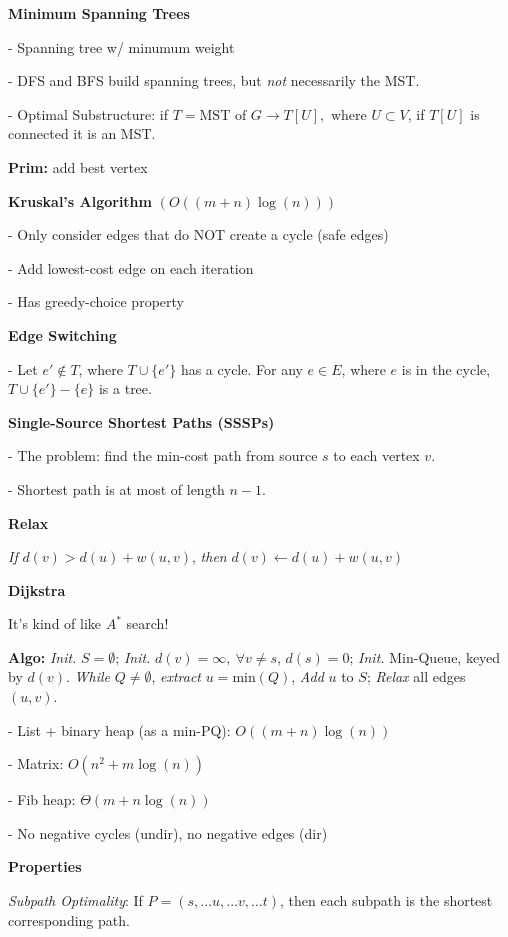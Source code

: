 \documentclass[8pt, letterpaper]{extarticle}
\begin{document}
\begin{minipage}[t]{0.45\textwidth}

    
\textbf{Minimum Spanning Trees}

- Spanning tree w/ minumum weight

- DFS and BFS build spanning trees, but \emph{not} necessarily the MST.

- Optimal Substructure: if $T = \text{MST of } G \rightarrow T[U], \text{ where } U \subset V$, if $T[U]$ is connected it is an MST.


\textbf{Prim: } add best vertex


\textbf{Kruskal's Algorithm} $(O((m + n)\log(n)))$

- Only consider edges that do NOT create a cycle (safe edges)

- Add lowest-cost edge on each iteration

- Has greedy-choice property


\textbf{Edge Switching}

- Let $e' \notin T$, where $T \cup \{e'\}$ has a cycle. For any $e \in E$, where $e$ is in the cycle, $T \cup \{e'\} - \{e\}$ is a tree.

\textbf{Single-Source Shortest Paths (SSSPs)}

- The problem: find the min-cost path from source $s$ to each vertex $v$.

- Shortest path is at most of length $n-1$.

\textbf{Relax}

\emph{If} $d(v) > d(u) + w(u, v)$, \emph{then} $d(v) \leftarrow d(u) + w(u, v)$

\textbf{Dijkstra}

It's kind of like $A^*$ search!

{\small \textbf{Algo:}} \emph{Init.} $S = \emptyset$; \emph{Init.} $d(v) = \infty,\ \forall v \neq s$, $d(s) = 0$; \emph{Init.} Min-Queue, keyed by $d(v)$. \emph{While} $Q \neq \emptyset$, \emph{extract} $u = \text{min}(Q)$, \emph{Add} $u$ to $S$; \emph{Relax} all edges $(u,v)$.

- List + binary heap (as a min-PQ): $O((m+n)\log(n))$

- Matrix: $O(n^2 + m\log(n))$

- Fib heap: $\Theta(m + n\log(n))$

- No negative cycles (undir), no negative edges (dir)

\textbf{Properties}

\emph{Subpath Optimality}: If $P = (s,...u,...v,...t)$, then each subpath is the shortest corresponding path.


\end{minipage}
\end{document}
